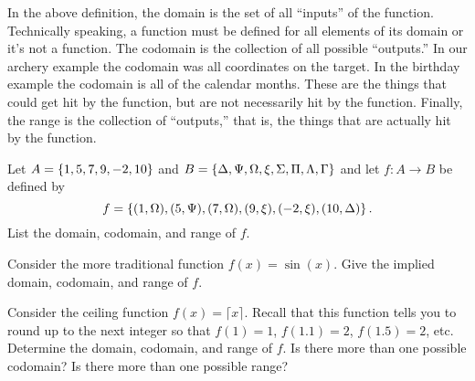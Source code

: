 In the above definition, the domain is the set of all ``inputs'' of the function.  Technically speaking, a function must be defined for all elements of its domain or it's not a function.  The codomain is the collection of all possible ``outputs.'' In our archery example the codomain was all coordinates on the target.  In the birthday example the codomain is all of the calendar months.  These are the things that could get hit by the function, but are not necessarily hit by the function.  Finally, the range is the collection of ``outputs,'' that is, the things that are actually hit by the function.

\begin{question}[resume]
\item Let $A = \left\{1,5,7,9,-2,10\right\}$ and $B = \left\{ \Delta, \Psi, \Omega, \xi, \Sigma, \Pi , \Lambda, \Gamma\right\}$ and let $f:A \to B$ be defined by 
\[f = \left\{(1,\Omega), (5, \Psi), (7, \Omega), (9,\xi), (-2,\xi),(10,\Delta)\right\}.\]
List the domain, codomain, and range of $f$.

\vspace{1.5in}

\item Consider the more traditional function $f(x)=\sin(x)$.  Give the implied domain, codomain, and range of $f$.

\vspace{1.5in}

\item Consider the ceiling function $f(x) = \lceil x \rceil$.  Recall that this function tells you to round up to the next integer so that $f(1)=1$, $f(1.1)=2$, $f(1.5)=2$, etc.  Determine the domain, codomain, and range of $f$.  Is there more than one possible codomain?  Is there more than one possible range?
\end{question}





